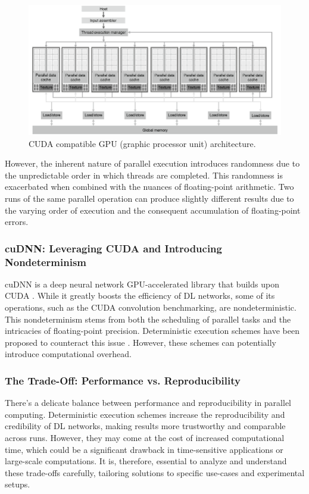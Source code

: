 \begin{figure}[htbp]
\centerline{\includegraphics[scale=.5]{figures/cuda.png}}
\caption{CUDA compatible GPU (graphic processor unit) architecture.~\cite{cuda2023} }
\label{fig:cuda}
\end{figure}

However, the inherent nature of parallel execution introduces randomness due to the unpredictable order in which threads are completed. This randomness is exacerbated when combined with the nuances of floating-point arithmetic. Two runs of the same parallel operation can produce slightly different results due to the varying order of execution and the consequent accumulation of floating-point errors.

\subsubsection*{cuDNN: Leveraging CUDA and Introducing Nondeterminism}

cuDNN is a deep neural network GPU-accelerated library that builds upon CUDA \cite{chetlur2014cudnn}. While it greatly boosts the efficiency of DL networks, some of its operations, such as the CUDA convolution benchmarking, are nondeterministic. This nondeterminism stems from both the scheduling of parallel tasks and the intricacies of floating-point precision. Deterministic execution schemes have been proposed to counteract this issue \cite{chou2020deterministic}. However, these schemes can potentially introduce computational overhead.

\subsubsection*{The Trade-Off: Performance vs. Reproducibility}

There's a delicate balance between performance and reproducibility in parallel computing. Deterministic execution schemes increase the reproducibility and credibility of DL networks, making results more trustworthy and comparable across runs. However, they may come at the cost of increased computational time, which could be a significant drawback in time-sensitive applications or large-scale computations. It is, therefore, essential to analyze and understand these trade-offs carefully, tailoring solutions to specific use-cases and experimental setups.\\

